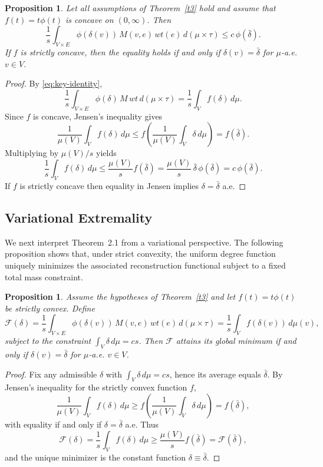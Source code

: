 \documentclass[final,1p,times]{elsarticle}
\newtheorem{prop}[thm]{Proposition}
\begin{document}
\begin{prop}
\label{prop:concave-proof}
Let all assumptions of Theorem~\ref{t3} hold and assume that \(f(t)=t\phi(t)\) is concave on \((0,\infty)\).
Then
\[
\frac{1}{s}\int_{V\times E}\phi(\delta(v))\,M(v,e)\,wt(e)\,d(\mu\times\tau)
\le
c\,\phi(\bar\delta).
\]
If $f$ is strictly concave, then the equality holds if and only if \( \delta(v)=\bar\delta \) for \(\mu\)-a.e. \(v\in V\). 
\end{prop}

\begin{proof}
By \eqref{eq:key-identity},
\[
\frac{1}{s}\int_{V\times E}\phi(\delta)\,M\,wt\,d(\mu\times\tau)
=
\frac{1}{s}\int_V f(\delta)\,d\mu.
\]
Since \(f\) is concave, Jensen's inequality gives
\[
\frac{1}{\mu(V)}\int_V f(\delta)\,d\mu \le f\!\left(\frac{1}{\mu(V)}\int_V\delta\,d\mu\right)=f(\bar\delta).
\]
Multiplying by \(\mu(V)/s\) yields
\[
\frac{1}{s}\int_V f(\delta)\,d\mu \le \frac{\mu(V)}{s} f(\bar\delta)
=\frac{\mu(V)}{s}\,\bar\delta\,\phi(\bar\delta)=c\,\phi(\bar\delta).
\]
If \(f\) is strictly concave then equality in Jensen implies \(\delta=\bar\delta\) a.e.
\end{proof}




\subsection{Variational Extremality}
We next interpret Theorem~2.1 from a variational perspective. The following proposition shows that, under strict convexity, the uniform degree function uniquely minimizes the associated reconstruction functional subject to a fixed total mass constraint.

\begin{prop}
\label{thm:variational-proof}
Assume the hypotheses of Theorem~\ref{t3} and let \(f(t)=t\phi(t)\) be strictly convex.
Define
\[
\mathcal{F}(\delta)
=
\frac{1}{s}\int_{V\times E}\phi(\delta(v))\,M(v,e)\,wt(e)\,d(\mu\times\tau)
=
\frac{1}{s}\int_V f(\delta(v))\,d\mu(v),
\]
subject to the constraint \(\int_V \delta\,d\mu=cs\).
Then \(\mathcal{F}\) attains its global minimum if and only if \(\delta(v)=\bar\delta\) for \(\mu\)-a.e. \(v\in V\).
\end{prop}

\begin{proof}
Fix any admissible \(\delta\) with \(\int_V\delta\,d\mu=cs\), hence its average equals \(\bar\delta\).
By Jensen's inequality for the strictly convex function \(f\),
\[
\frac{1}{\mu(V)}\int_V f(\delta)\,d\mu \ge f\!\left(\frac{1}{\mu(V)}\int_V\delta\,d\mu\right)=f(\bar\delta),
\]
with equality if and only if \(\delta=\bar\delta\) a.e. Thus
\[
\mathcal{F}(\delta)=\frac{1}{s}\int_V f(\delta)\,d\mu \ge \frac{\mu(V)}{s}f(\bar\delta)=\mathcal{F}(\bar\delta),
\]
and the unique minimizer is the constant function \(\delta\equiv\bar\delta\).
\end{proof}
\end{document}
